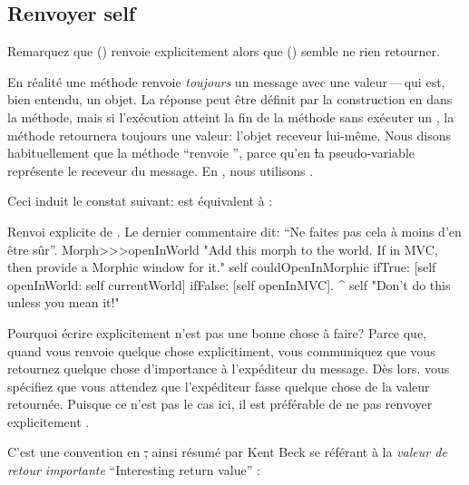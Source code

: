 \documentclass[a4paper,10pt,twoside]{book}
\begin{document}
\subsection{Renvoyer self}

Remarquez que  () renvoie explicitement  alors que  () semble ne rien retourner.

En r\'ealit\'e une m\'ethode renvoie \emph{toujours} un message avec une valeur\,---\,qui est, bien entendu, un objet.
La r\'eponse peut \^etre d\'efinit par la construction en \ct{^} dans la m\'ethode, mais si l'ex\'ecution atteint la fin de la m\'ethode sans ex\'ecuter un \ct{^}, la m\'ethode retournera toujours une valeur: l'objet receveur lui-m\^eme.
Nous disons habituellement que la m\'ethode ``renvoie \self'', parce qu'en
\st la pseudo-variable \self repr\'esente le receveur du message. En , nous utilisons .

Ceci induit le constat suivant:  est \'equivalent \`a \mbox{:}

\begin{method}[openInWorldReturnSelf]{Renvoi explicite de \mbox{\self.} Le dernier commentaire dit: ``Ne faites pas cela \`a moins d'en \^etre s\^ur''.}
Morph>>>openInWorld
	"Add this morph to the world.  If in MVC,
	then provide a Morphic window for it."
	self couldOpenInMorphic
		ifTrue: [self openInWorld: self currentWorld]
		ifFalse: [self openInMVC].
	^ self		"Don't do this unless you mean it!"
\end{method}

Pourquoi \'ecrire  explicitement n'est pas une bonne chose \`a faire?
Parce que, quand vous renvoie quelque chose explicitiment, vous communiquez
que vous retournez quelque chose d'importance \`a l'exp\'editeur du message.
D\`es lors. vous sp\'ecifiez que vous attendez que l'exp\'editeur fasse quelque chose de la valeur retourn\'ee.
Puisque ce n'est pas le cas ici, il est pr\'ef\'erable de ne pas renvoyer explicitement \self.

C'est une convention en \st, ainsi r\'esum\'e par Kent Beck se r\'ef\'erant \`a la \emph{valeur de retour importante} ``Interesting return value'' \cite{Beck97a}:
\end{document}
